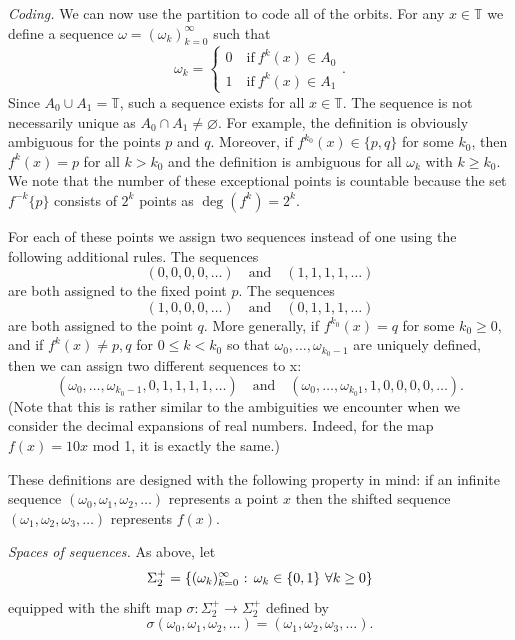 \documentclass[12pt]{article}
\theoremstyle{definition}
\theoremstyle{remark}
\begin{document}
\medskip
\noindent
{\it Coding.}
We can now use the partition to code all of the orbits. For any $x \in \mathbb T$ we define a
sequence $\omega = (\omega_k)_{k=0}^\infty$ such that
\[
\omega_k = \begin{cases} 0 \quad \text{if} \ f^k(x) \in A_0 \\
1 \quad \text{if} \ f^k(x) \in A_1 \end{cases}.
\]
Since $A_0 \cup A_1 = \mathbb T$, such a sequence exists for all $x \in \mathbb T$. 
The sequence is not necessarily unique
as $A_0 \cap A_1 \ne \varnothing$. For example, the definition is obviously ambiguous 
for the points $p$ and $q$.
Moreover, if $f^{k_0}(x) \in \{p,q\}$ for some $k_0$, then $f^k(x) = p$ for all $k > k_0$ and the 
definition is
ambiguous for all $\omega_k$ with $k \ge k_0$. We note that the number of these exceptional points is
countable because the set $f^{-k}\{p\}$ consists of $2^k$ points as $\deg(f^k) = 2^k$.

For each of these points we assign two sequences instead of one using the following additional
rules. The sequences
\[
(0,0,0,0,\ldots) \quad \text{and} \quad (1,1,1,1,\ldots)
\]
are both assigned to the fixed point $p$. The sequences
\[
(1,0,0,0,\ldots) \quad \text{and} \quad (0,1,1,1,\ldots)
\]
are both assigned to the point $q$. 
More generally, if $f^{k_0}(x) = q$ for some $k_0 \ge 0$, and if
$f^k(x) \ne p,q$ for $0 \le k < k_0$ so that $\omega_0,\ldots,\omega_{k_0 -1}$ are uniquely defined,
then we can assign two different sequences to x:
\[
(\omega_0,\ldots,\omega_{k_0 -1},0,1,1,1,1, \ldots) \quad
\text{and} \quad 
(\omega_0,\ldots,\omega_{k_0 1},1,0,0,0,0,\ldots).
\]
(Note that this is rather similar to the ambiguities we encounter when we consider the decimal expansions of real numbers. Indeed, for the map $f(x)=10x$ mod 1, it is exactly the same.)

These definitions are designed with the following property in mind: if an infinite sequence
$(\omega_0,\omega_1,\omega_2,\ldots)$ represents 
a point $x$ then the shifted sequence $(\omega_1,\omega_2,\omega_3,\ldots)$ represents $f(x)$.



\medskip
\noindent
{\it Spaces of sequences.}
As above, let 
\[
\Sigma_2^+ = \left\{(\omega_k)_{k=0}^\infty \hbox{ : } \omega_k \in\{0,1\} \ \forall k \ge 0\right\}
\]
equipped with the shift map $\sigma : \Sigma_2^+ \to \Sigma_2^+$ defined by
\[
\sigma(\omega_0,\omega_1,\omega_2,\ldots) = (\omega_1,\omega_2,\omega_3,\ldots).
\]
\end{document}
